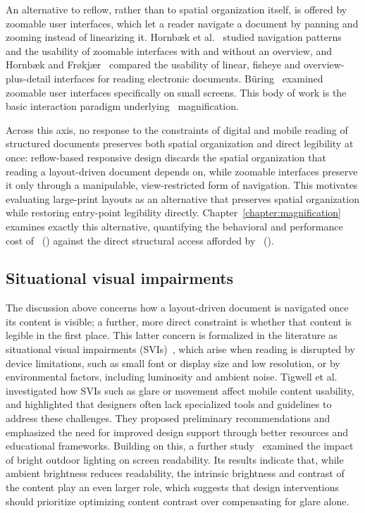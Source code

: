 An alternative to reflow, rather than to spatial organization itself, is offered by zoomable user interfaces, which let a reader navigate a document by panning and zooming instead of linearizing it. Hornbæk et al.~\cite{nav-patterns-2002} studied navigation patterns and the usability of zoomable interfaces with and without an overview, and Hornbæk and Frøkjær~\cite{hornb_reading_2001} compared the usability of linear, fisheye and overview-plus-detail interfaces for reading electronic documents. Büring~\cite{buring_zoomable} examined zoomable user interfaces specifically on small screens. This body of work is the basic interaction paradigm underlying \panzoom\ magnification.

Across this axis, no response to the constraints of digital and mobile reading of structured documents preserves both spatial organization and direct legibility at once: reflow-based responsive design discards the spatial organization that reading a layout-driven document depends on, while zoomable interfaces preserve it only through a manipulable, view-restricted form of navigation. This motivates evaluating large-print layouts as an alternative that preserves spatial organization while restoring entry-point legibility directly. Chapter~\ref{chapter:magnification} examines exactly this alternative, quantifying the behavioral and performance cost of \condone\ (\condonenot) against the direct structural access afforded by \condtwo\ (\condtwonot).

\subsection{Situational visual impairments}
\label{sec:sota-svi}

The discussion above concerns how a layout-driven document is navigated once its content is visible; a further, more direct constraint is whether that content is legible in the first place. This latter concern is formalized in the literature as situational visual impairments (SVIs)~\cite{svi-challenges}, which arise when reading is disrupted by device limitations, such as small font or display size and low resolution, or by environmental factors, including luminosity and ambient noise. Tigwell et al.~\cite{tigwell-2018} investigated how SVIs such as glare or movement affect mobile content usability, and highlighted that designers often lack specialized tools and guidelines to address these challenges. They proposed preliminary recommendations and emphasized the need for improved design support through better resources and educational frameworks. Building on this, a further study~\cite{svi-bright-env} examined the impact of bright outdoor lighting on screen readability. Its results indicate that, while ambient brightness reduces readability, the intrinsic brightness and contrast of the content play an even larger role, which suggests that design interventions should prioritize optimizing content contrast over compensating for glare alone.

